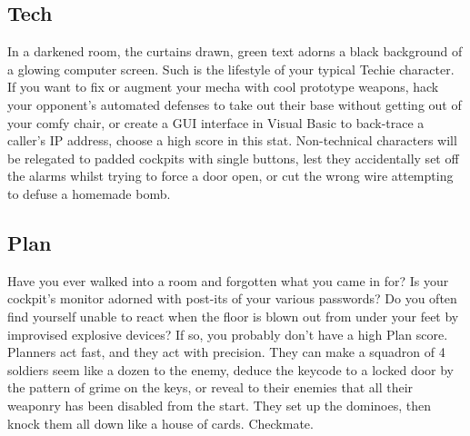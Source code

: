 \subsection{Tech}
In a darkened room, the curtains drawn, green text adorns a black background of a glowing computer screen. Such is the lifestyle of your typical Techie character. If you want to fix or augment your mecha with cool prototype weapons, hack your opponent's automated defenses to take out their base without getting out of your comfy chair, or create a GUI interface in Visual Basic to back-trace a caller's IP address, choose a high score in this stat. Non-technical characters will be relegated to padded cockpits with single buttons, lest they accidentally set off the alarms whilst trying to force a door open, or cut the wrong wire attempting to defuse a homemade bomb.

\subsection{Plan}
Have you ever walked into a room and forgotten what you came in for? Is your cockpit's monitor adorned with post-its of your various passwords? Do you often find yourself unable to react when the floor is blown out from under your feet by improvised explosive devices? If so, you probably don't have a high Plan score. Planners act fast, and they act with precision. They can make a squadron of 4 soldiers seem like a dozen to the enemy, deduce the keycode to a locked door by the pattern of grime on the keys, or reveal to their enemies that all their weaponry has been disabled from the start. They set up the dominoes, then knock them all down like a house of cards. Checkmate.
